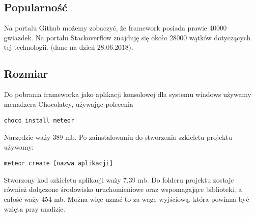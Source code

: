 \documentclass[12pt]{report}
\begin{document}
    \subsection{Popularność}
      Na portalu Github możemy zobaczyć, że framework posiada prawie 40000 gwiazdek.
      Na portalu Stackoverflow znajduję się około 28000 wątków dotyczących tej technologii.
      (dane na dzień 28.06.2018).

    \subsection{Rozmiar}
      Do pobrania frameworka jako aplikacji konsolowej dla systemu windows używamy menadzera Chocolatey, używając polecenia
      \begin{lstlisting}[language=bash,numbers=none]
        choco install meteor
      \end{lstlisting}
      Narzędzie waży 389 mb.
      Po zainstalowaniu do stworzenia szkieletu projektu używamy:
      \begin{lstlisting}[language=bash,numbers=none]
        meteor create [nazwa aplikacji]
      \end{lstlisting}
      Stworzony kod szkieletu aplikacji waży 7.39 mb.
      Do folderu projektu zostaje również dołączone środowisko uruchomieniowe oraz wspomagające biblioteki, a całość waży 454 mb.
      Można więc uznać to za wagę wyjściową, która powinna być wzięta przy analizie.
\end{document}

